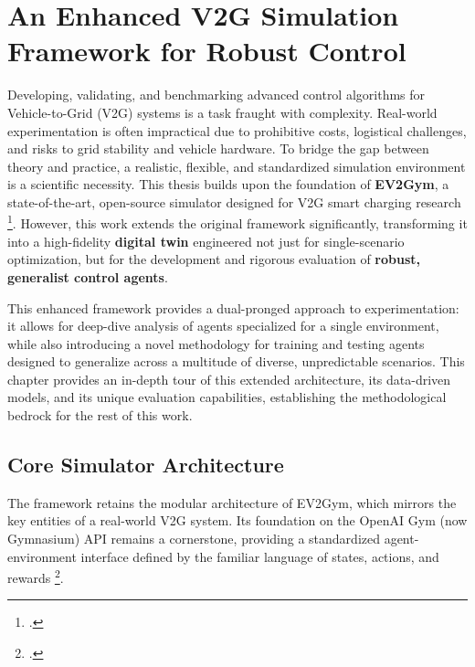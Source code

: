 \chapter{An Enhanced V2G Simulation Framework for Robust Control}
\label{chap:ev2gym}

Developing, validating, and benchmarking advanced control algorithms for Vehicle-to-Grid (V2G) systems is a task fraught with complexity. Real-world experimentation is often impractical due to prohibitive costs, logistical challenges, and risks to grid stability and vehicle hardware. To bridge the gap between theory and practice, a realistic, flexible, and standardized simulation environment is a scientific necessity. This thesis builds upon the foundation of \textbf{EV2Gym}, a state-of-the-art, open-source simulator designed for V2G smart charging research \footcite{orfanoudakis2024ev2gym}. However, this work extends the original framework significantly, transforming it into a high-fidelity \textbf{digital twin} engineered not just for single-scenario optimization, but for the development and rigorous evaluation of \textbf{robust, generalist control agents}.

This enhanced framework provides a dual-pronged approach to experimentation: it allows for deep-dive analysis of agents specialized for a single environment, while also introducing a novel methodology for training and testing agents designed to generalize across a multitude of diverse, unpredictable scenarios. This chapter provides an in-depth tour of this extended architecture, its data-driven models, and its unique evaluation capabilities, establishing the methodological bedrock for the rest of this work.

\section{Core Simulator Architecture}
The framework retains the modular architecture of EV2Gym, which mirrors the key entities of a real-world V2G system. Its foundation on the OpenAI Gym (now Gymnasium) API remains a cornerstone, providing a standardized agent-environment interface defined by the familiar language of states, actions, and rewards \footcite{brockman2016openai}.

